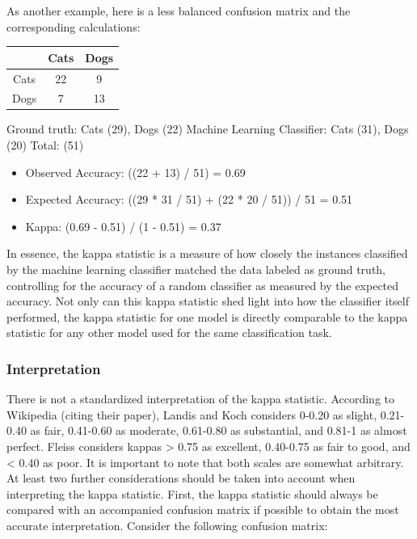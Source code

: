 \documentclass[caret-main.tex]{subfiles}
\begin{document}
As another example, here is a less balanced confusion matrix and the corresponding calculations:

\begin{center}
\begin{tabular}{|c|c|c|}
\hline 
    & Cats &Dogs \\ \hline
Cats& 22 & 9 \\ \hline
Dogs& 7  & 13  \\ \hline
\end{tabular} 
\end{center}


Ground truth: Cats (29), Dogs (22) 
Machine Learning Classifier: Cats (31), Dogs (20) 
Total: (51) 

\begin{itemize}
\item Observed Accuracy: ((22 + 13) / 51) = 0.69 
\item Expected Accuracy: ((29 * 31 / 51) + (22 * 20 / 51)) / 51 = 0.51 
\item Kappa: (0.69 - 0.51) / (1 - 0.51) = 0.37
\end{itemize}
In essence, the kappa statistic is a measure of how closely the instances classified by the machine learning classifier matched the data labeled as ground truth, controlling for the accuracy of a random classifier as measured by the expected accuracy. Not only can this kappa statistic shed light into how the classifier itself performed, the kappa statistic for one model is directly comparable to the kappa statistic for any other model used for the same classification task.

\subsubsection{Interpretation}

There is not a standardized interpretation of the kappa statistic. According to Wikipedia (citing their paper), Landis and Koch considers 0-0.20 as slight, 0.21-0.40 as fair, 0.41-0.60 as moderate, 0.61-0.80 as substantial, and 0.81-1 as almost perfect. Fleiss considers kappas > 0.75 as excellent, 0.40-0.75 as fair to good, and < 0.40 as poor. It is important to note that both scales are somewhat arbitrary. At least two further considerations should be taken into account when interpreting the kappa statistic. First, the kappa statistic should always be compared with an accompanied confusion matrix if possible to obtain the most accurate interpretation. Consider the following confusion matrix:
\end{document}
